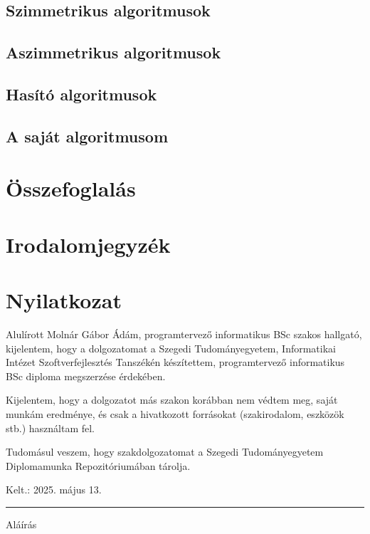 \documentclass[12pt]{report} %
\begin{document}
\section{Szimmetrikus algoritmusok} %

\section{Aszimmetrikus algoritmusok} %

\section{Hasító algoritmusok} %

\section{A saját algoritmusom} %

\chapter{Összefoglalás} %

\chapter*{Irodalomjegyzék} %

\chapter*{Nyilatkozat} %

Alulírott Molnár Gábor Ádám, programtervező informatikus BSc szakos hallgató, kijelentem, hogy a dolgozatomat a Szegedi Tudományegyetem, Informatikai Intézet Szoftverfejlesztés Tanszékén készítettem, programtervező informatikus BSc diploma megszerzése érdekében.

Kijelentem, hogy a dolgozatot más szakon korábban nem védtem meg, saját munkám eredménye, és csak a hivatkozott forrásokat (szakirodalom, eszközök stb.) használtam fel.

Tudomásul veszem, hogy szakdolgozatomat a Szegedi Tudományegyetem Diplomamunka Repozitóriumában tárolja.

\vspace{1cm}

{\large Kelt.: 2025. május 13.}

\vspace{0.5cm}
\hfill
\parbox{5cm}{\centering\hrule\vspace{0.3cm} Aláírás}
\end{document}
